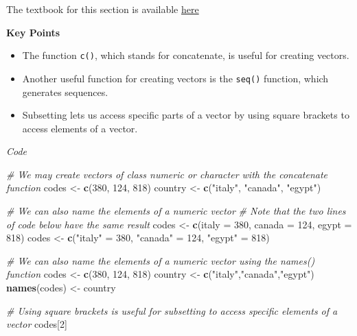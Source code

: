 \documentclass[
]{article}
\newenvironment{Shaded}{\begin{snugshade}}{\end{snugshade}}
\newcommand{\CommentTok}[1]{\textcolor[rgb]{0.56,0.35,0.01}{\textit{#1}}}
\newcommand{\DataTypeTok}[1]{\textcolor[rgb]{0.13,0.29,0.53}{#1}}
\newcommand{\DecValTok}[1]{\textcolor[rgb]{0.00,0.00,0.81}{#1}}
\newcommand{\KeywordTok}[1]{\textcolor[rgb]{0.13,0.29,0.53}{\textbf{#1}}}
\newcommand{\NormalTok}[1]{#1}
\newcommand{\StringTok}[1]{\textcolor[rgb]{0.31,0.60,0.02}{#1}}
\providecommand{\tightlist}{%
  \setlength{\itemsep}{0pt}\setlength{\parskip}{0pt}}
\begin{document}
The textbook for this section is available
\href{https://rafalab.github.io/dsbook/r-basics.html\#vectors}{here}

\textbf{Key Points}

\begin{itemize}
\tightlist
\item
  The function \texttt{c()}, which stands for concatenate, is useful for
  creating vectors.
\item
  Another useful function for creating vectors is the \texttt{seq()}
  function, which generates sequences.
\item
  Subsetting lets us access specific parts of a vector by using square
  brackets to access elements of a vector.
\end{itemize}

\emph{Code}

\begin{Shaded}
\begin{Highlighting}[]
\CommentTok{# We may create vectors of class numeric or character with the concatenate function}
\NormalTok{codes <-}\StringTok{ }\KeywordTok{c}\NormalTok{(}\DecValTok{380}\NormalTok{, }\DecValTok{124}\NormalTok{, }\DecValTok{818}\NormalTok{)}
\NormalTok{country <-}\StringTok{ }\KeywordTok{c}\NormalTok{(}\StringTok{"italy"}\NormalTok{, }\StringTok{"canada"}\NormalTok{, }\StringTok{"egypt"}\NormalTok{)}

\CommentTok{# We can also name the elements of a numeric vector}
\CommentTok{# Note that the two lines of code below have the same result}
\NormalTok{codes <-}\StringTok{ }\KeywordTok{c}\NormalTok{(}\DataTypeTok{italy =} \DecValTok{380}\NormalTok{, }\DataTypeTok{canada =} \DecValTok{124}\NormalTok{, }\DataTypeTok{egypt =} \DecValTok{818}\NormalTok{)}
\NormalTok{codes <-}\StringTok{ }\KeywordTok{c}\NormalTok{(}\StringTok{"italy"}\NormalTok{ =}\StringTok{ }\DecValTok{380}\NormalTok{, }\StringTok{"canada"}\NormalTok{ =}\StringTok{ }\DecValTok{124}\NormalTok{, }\StringTok{"egypt"}\NormalTok{ =}\StringTok{ }\DecValTok{818}\NormalTok{)}

\CommentTok{# We can also name the elements of a numeric vector using the names() function}
\NormalTok{codes <-}\StringTok{ }\KeywordTok{c}\NormalTok{(}\DecValTok{380}\NormalTok{, }\DecValTok{124}\NormalTok{, }\DecValTok{818}\NormalTok{)}
\NormalTok{country <-}\StringTok{ }\KeywordTok{c}\NormalTok{(}\StringTok{"italy"}\NormalTok{,}\StringTok{"canada"}\NormalTok{,}\StringTok{"egypt"}\NormalTok{)}
\KeywordTok{names}\NormalTok{(codes) <-}\StringTok{ }\NormalTok{country}

\CommentTok{# Using square brackets is useful for subsetting to access specific elements of a vector}
\NormalTok{codes[}\DecValTok{2}\NormalTok{]}
\end{Highlighting}
\end{Shaded}
\end{document}

